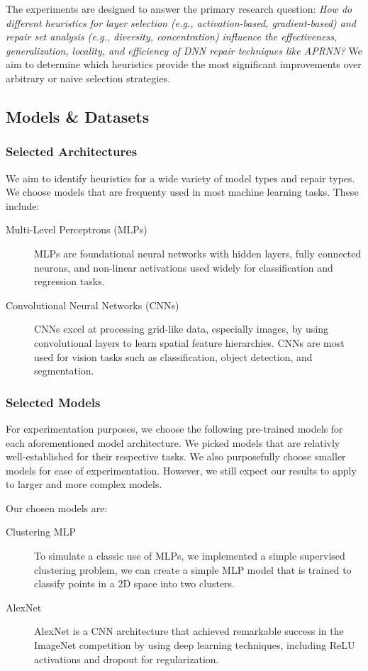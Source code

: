 \documentclass{article}
\begin{document}
The experiments are designed to answer the primary research question:
\textit{How do different heuristics for layer selection (e.g., activation-based, gradient-based) and repair set analysis (e.g., diversity, concentration) influence the effectiveness, generalization, locality, and efficiency of DNN repair techniques like APRNN?}
We aim to determine which heuristics provide the most significant improvements over arbitrary or naive selection strategies.

\subsection{Models \& Datasets}

\subsubsection{Selected Architectures}
We aim to identify heuristics for a wide variety of model types and repair types.
We choose models that are frequenty used in most machine learning tasks.
These include:

\begin{description}
	\item[Multi-Level Perceptrons (MLPs)] {
		MLPs are foundational neural networks with hidden layers, fully connected neurons, and non-linear activations used widely for classification and regression tasks.
		}
	\item[Convolutional Neural Networks (CNNs)] {
		CNNs excel at processing grid-like data, especially images, by using convolutional layers to learn spatial feature hierarchies.
		CNNs are most used for vision tasks such as classification, object detection, and segmentation.
		}
\end{description}

\subsubsection{Selected Models}

For experimentation purposes, we choose the following pre-trained models for each aforementioned model architecture.
We picked models that are relativly well-established for their respective tasks.
We also purposefully choose smaller models for ease of experimentation.
However, we still expect our results to apply to larger and more complex models.

Our chosen models are:
\begin{description}
	\item[Clustering MLP] {
		To simulate a classic use of MLPs, we implemented a simple supervised clustering problem, we can create a simple MLP model that is trained to classify points in a 2D space into two clusters.
		}
	\item[AlexNet \cite{alexnet}] AlexNet is a CNN architecture that achieved remarkable success in the ImageNet competition by using deep learning techniques, including ReLU activations and dropout for regularization.
\end{description}
\end{document}
